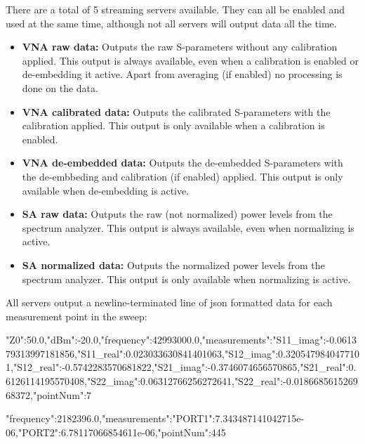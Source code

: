 \documentclass[a4paper,11pt]{article}
\begin{document}
There are a total of 5 streaming servers available. They can all be enabled and used at the same time, although not all servers will output data all the time.

\begin{itemize}
\item \textbf{VNA raw data:} Outputs the raw S-parameters without any calibration applied. This output is always available, even when a calibration is enabled or de-embedding it active. Apart from averaging (if enabled) no processing is done on the data.
\item \textbf{VNA calibrated data:} Outputs the calibrated S-parameters with the calibration applied. This output is only available when a calibration is enabled.
\item \textbf{VNA de-embedded data:} Outputs the de-embedded S-parameters with the de-embbeding and calibration (if enabled) applied. This output is only available when de-embedding is active.
\item \textbf{SA raw data:} Outputs the raw (not normalized) power levels from the spectrum analyzer. This output is always available, even when normalizing is active.
\item \textbf{SA normalized data:} Outputs the normalized power levels from the spectrum analyzer. This output is only available when normalizing is active.
\end{itemize}

\vspace{0.5cm}

All servers output a newline-terminated line of json formatted data for each measurement point in the sweep:

\begin{example}
{"Z0":50.0,"dBm":-20.0,"frequency":42993000.0,"measurements":{"S11_imag":-0.061379313997181856,"S11_real":0.023033630841401063,"S12_imag":0.3205479840477101,"S12_real":-0.5742283570681822,"S21_imag":-0.3746074656570865,"S21_real":0.6126114195570408,"S22_imag":0.06312766256272641,"S22_real":-0.018668561526968372},"pointNum":7}
\end{example}
\begin{example}
{"frequency":2182396.0,"measurements":{"PORT1":7.343487141042715e-06,"PORT2":6.78117066854611e-06},"pointNum":445}
\end{example}
\end{document}

